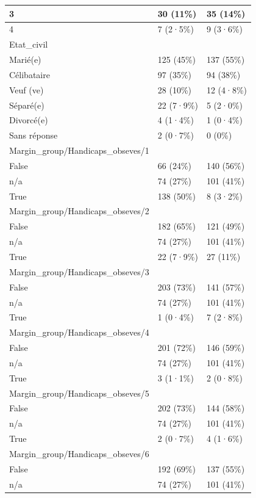 \documentclass[
]{book}
\begin{document}
\begin{tabular}{l|l|l}
\hline
3 & 30 (11\%) & 35 (14\%)\\
\hline
4 & 7 (2·5\%) & 9 (3·6\%)\\
\hline
Etat\_civil &  & \\
\hline
Marié(e) & 125 (45\%) & 137 (55\%)\\
\hline
Célibataire & 97 (35\%) & 94 (38\%)\\
\hline
Veuf (ve) & 28 (10\%) & 12 (4·8\%)\\
\hline
Séparé(e) & 22 (7·9\%) & 5 (2·0\%)\\
\hline
Divorcé(e) & 4 (1·4\%) & 1 (0·4\%)\\
\hline
Sans réponse & 2 (0·7\%) & 0 (0\%)\\
\hline
Margin\_group/Handicaps\_obseves/1 &  & \\
\hline
False & 66 (24\%) & 140 (56\%)\\
\hline
n/a & 74 (27\%) & 101 (41\%)\\
\hline
True & 138 (50\%) & 8 (3·2\%)\\
\hline
Margin\_group/Handicaps\_obseves/2 &  & \\
\hline
False & 182 (65\%) & 121 (49\%)\\
\hline
n/a & 74 (27\%) & 101 (41\%)\\
\hline
True & 22 (7·9\%) & 27 (11\%)\\
\hline
Margin\_group/Handicaps\_obseves/3 &  & \\
\hline
False & 203 (73\%) & 141 (57\%)\\
\hline
n/a & 74 (27\%) & 101 (41\%)\\
\hline
True & 1 (0·4\%) & 7 (2·8\%)\\
\hline
Margin\_group/Handicaps\_obseves/4 &  & \\
\hline
False & 201 (72\%) & 146 (59\%)\\
\hline
n/a & 74 (27\%) & 101 (41\%)\\
\hline
True & 3 (1·1\%) & 2 (0·8\%)\\
\hline
Margin\_group/Handicaps\_obseves/5 &  & \\
\hline
False & 202 (73\%) & 144 (58\%)\\
\hline
n/a & 74 (27\%) & 101 (41\%)\\
\hline
True & 2 (0·7\%) & 4 (1·6\%)\\
\hline
Margin\_group/Handicaps\_obseves/6 &  & \\
\hline
False & 192 (69\%) & 137 (55\%)\\
\hline
n/a & 74 (27\%) & 101 (41\%)\\

\end{tabular}
\end{document}
